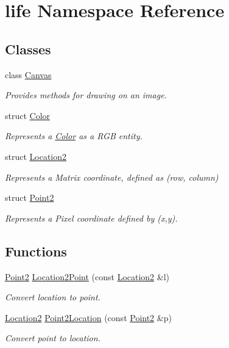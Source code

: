 \hypertarget{namespacelife}{}\section{life Namespace Reference}
\label{namespacelife}
\subsection*{Classes}
\begin{DoxyCompactItemize}
\item 
class \mbox{\hyperlink{classlife_1_1_canvas}{Canvas}}
\begin{DoxyCompactList}\small\item\em Provides methods for drawing on an image. \end{DoxyCompactList}\item 
struct \mbox{\hyperlink{structlife_1_1_color}{Color}}
\begin{DoxyCompactList}\small\item\em Represents a \mbox{\hyperlink{structlife_1_1_color}{Color}} as a R\+GB entity. \end{DoxyCompactList}\item 
struct \mbox{\hyperlink{structlife_1_1_location2}{Location2}}
\begin{DoxyCompactList}\small\item\em Represents a Matrix coordinate, defined as (row, column) \end{DoxyCompactList}\item 
struct \mbox{\hyperlink{structlife_1_1_point2}{Point2}}
\begin{DoxyCompactList}\small\item\em Represents a Pixel coordinate defined by {\ttfamily (x,y)}. \end{DoxyCompactList}\end{DoxyCompactItemize}
\subsection*{Functions}
\begin{DoxyCompactItemize}
\item 
\mbox{\hyperlink{structlife_1_1_point2}{Point2}} \mbox{\hyperlink{namespacelife_a2cb57fbc30678a4af892aabba49e77b4}{Location2\+Point}} (const \mbox{\hyperlink{structlife_1_1_location2}{Location2}} \&l)
\begin{DoxyCompactList}\small\item\em Convert location to point. \end{DoxyCompactList}\item 
\mbox{\hyperlink{structlife_1_1_location2}{Location2}} \mbox{\hyperlink{namespacelife_ac4366756068df38eaa72ff9f338a55ba}{Point2\+Location}} (const \mbox{\hyperlink{structlife_1_1_point2}{Point2}} \&p)
\begin{DoxyCompactList}\small\item\em Convert point to location. \end{DoxyCompactList}\end{DoxyCompactItemize}


